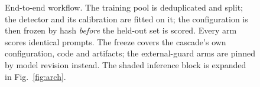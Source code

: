 \documentclass[journal]{IEEEtran}
\begin{document}
\begin{figure}[h]
\caption{End-to-end workflow. The training pool is deduplicated and split; the
detector and its calibration are fitted on it; the configuration is then frozen
by hash \emph{before} the held-out set is scored. Every arm scores identical
prompts. The freeze covers the cascade's own configuration, code and artifacts;
the external-guard arms are pinned by model revision instead. The shaded
inference block is expanded in Fig.~\ref{fig:arch}.}
\label{fig:overview}
\end{figure}
\end{document}

